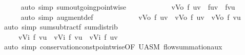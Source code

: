 \begin{isabellebody}
\ \ \ \ \isamarkupfalse%
\ {\isacharparenleft}auto\ simp{\isacharcolon}\ sum{\isacharunderscore}outgoing{\isacharunderscore}pointwise{\isacharparenright}\isanewline
\ \ \isamarkupfalse%
\ \isamarkupfalse%
\ {\isachardoublequoteopen}{\isasymdots}\ \isanewline
\ \ \ \ {\isacharequal}\ {\isacharparenleft}{\isasymSum}v{\isasymin}{\isacharquery}Vo{\isachardot}\ f\ {\isacharparenleft}u{\isacharcomma}v{\isacharparenright}\ {\isacharplus}\ f{\isacharprime}{\isacharparenleft}u{\isacharcomma}v{\isacharparenright}\ {\isacharminus}\ f{\isacharprime}{\isacharparenleft}v{\isacharcomma}u{\isacharparenright}{\isacharparenright}{\isachardoublequoteclose}\ \ \isanewline
\ \ \ \ \isamarkupfalse%
\ {\isacharparenleft}auto\ simp{\isacharcolon}\ augment{\isacharunderscore}def{\isacharparenright}\isanewline
\ \ \isamarkupfalse%
\ \isamarkupfalse%
\ {\isachardoublequoteopen}{\isasymdots}\ \isanewline
\ \ \ \ {\isacharequal}\ {\isacharparenleft}{\isasymSum}v{\isasymin}{\isacharquery}Vo{\isachardot}\ f\ {\isacharparenleft}u{\isacharcomma}v{\isacharparenright}{\isacharparenright}\ {\isacharplus}\ {\isacharparenleft}{\isasymSum}v{\isasymin}{\isacharquery}Vo{\isachardot}\ f{\isacharprime}\ {\isacharparenleft}u{\isacharcomma}v{\isacharparenright}{\isacharparenright}\ {\isacharminus}\ {\isacharparenleft}{\isasymSum}v{\isasymin}{\isacharquery}Vo{\isachardot}\ f{\isacharprime}\ {\isacharparenleft}v{\isacharcomma}u{\isacharparenright}{\isacharparenright}{\isachardoublequoteclose}\isanewline
\ \ \ \ \isamarkupfalse%
\ {\isacharparenleft}auto\ simp{\isacharcolon}\ sum{\isacharunderscore}subtractf\ sum{\isachardot}distrib{\isacharparenright}\isanewline
\ \ \isamarkupfalse%
\ \isamarkupfalse%
\ {\isachardoublequoteopen}{\isasymdots}\ \isanewline
\ \ \ \ {\isacharequal}\ {\isacharparenleft}{\isasymSum}v{\isasymin}{\isacharquery}Vi{\isachardot}\ f\ {\isacharparenleft}v{\isacharcomma}u{\isacharparenright}{\isacharparenright}\ {\isacharplus}\ {\isacharparenleft}{\isasymSum}v{\isasymin}{\isacharquery}Vi{\isachardot}\ f{\isacharprime}\ {\isacharparenleft}v{\isacharcomma}u{\isacharparenright}{\isacharparenright}\ {\isacharminus}\ {\isacharparenleft}{\isasymSum}v{\isasymin}{\isacharquery}Vi{\isachardot}\ f{\isacharprime}\ {\isacharparenleft}u{\isacharcomma}v{\isacharparenright}{\isacharparenright}{\isachardoublequoteclose}\ \isanewline
\ \ \ \ \isamarkupfalse%
\ {\isacharparenleft}auto\ simp{\isacharcolon}\ conservation{\isacharunderscore}const{\isacharunderscore}pointwise{\isacharbrackleft}OF\ U{\isacharunderscore}ASM{\isacharbrackright}\ flow{\isacharunderscore}summation{\isacharunderscore}aux{\isacharparenright}\isanewline

\end{isabellebody}
